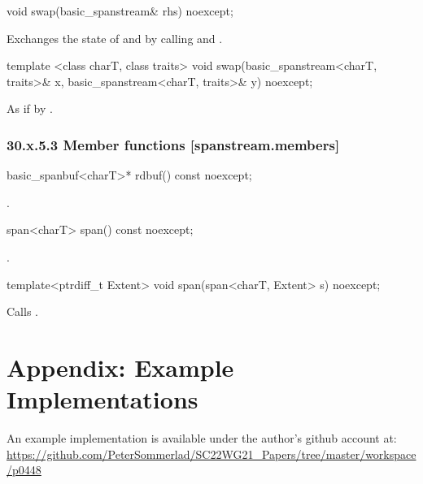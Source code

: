 \documentclass[ebook,11pt,article]{memoir}
\begin{document}
\begin{itemdecl}
void swap(basic_spanstream& rhs) noexcept;
\end{itemdecl}

\begin{itemdescr}
\pnum
\effects Exchanges the state of  and
 by calling
 and
.
\end{itemdescr}


\begin{itemdecl}
template <class charT, class traits>
  void swap(basic_spanstream<charT, traits>& x,
            basic_spanstream<charT, traits>& y) noexcept;
\end{itemdecl}

\begin{itemdescr}
\pnum
\effects As if by .
\end{itemdescr}

\subsection{30.x.5.3 Member functions [spanstream.members]}
\label{spanstream.members}

\begin{itemdecl}
basic_spanbuf<charT>* rdbuf() const noexcept;
\end{itemdecl}

\begin{itemdescr}
\pnum
\returns
{}.
\end{itemdescr}

\begin{itemdecl}
span<charT> span() const noexcept;
\end{itemdecl}

\begin{itemdescr}
\pnum
\returns
{}.
\end{itemdescr}

\begin{itemdecl}
template<ptrdiff_t Extent>
void span(span<charT, Extent> s) noexcept;
\end{itemdecl}

\begin{itemdescr}
\pnum
\effects
Calls
.
\end{itemdescr}



\chapter{Appendix: Example Implementations}
An example implementation is available under the author's github account at:
\url{https://github.com/PeterSommerlad/SC22WG21_Papers/tree/master/workspace/p0448}
\end{document}
